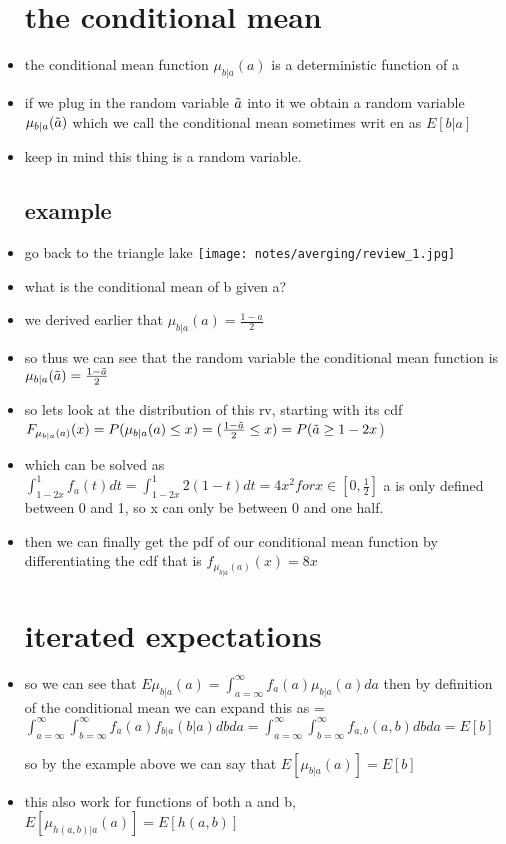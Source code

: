 \documentclass{article}
\begin{document}
\begin{itemize}
\section{the conditional mean}
\item the conditional mean function $\mu_{b|a}(a)$ is a deterministic function of a 
\item if we plug in the random variable $\Tilde{a}$ into it we obtain a random variable $\mu_{b|a}(\Tilde{a})$ which we call the conditional mean sometimes writ en as $E[b|a]$ 
\item keep in mind this thing is a random variable. 
\subsection{example}
\item go back to the triangle lake \texttt{[image: notes/averging/review\_1.jpg]}
\item what is the conditional mean of b given a?
\item we derived earlier that $\mu_{b|a}(a)=\frac{1-a}{2}$
\item so thus we can see that the random variable the conditional mean function is $\mu_{b|a}(\Tilde{a})=\frac{1-\Tilde{a}}{2}$ 
\item so lets look at the distribution of this rv, starting with its cdf $F_{\mu_{b|a}(a)}(x)=P(\mu_{b|a}(a)\leq x)=(\frac{1-\Tilde{a}}{2}\leq x)=P(\Tilde{a}\geq 1-2x$)
\item which can be solved as $\int_{1-2x}^{1}f_{a}(t)dt=\int_{1-2x}^{1}2(1-t)dt=4x^2 for x\in [0,\frac{1}{2}]$ a is only defined between 0 and 1, so x can only be between 0 and one half. 
\item then we can finally get the pdf of our conditional mean function by differentiating the cdf that is $f_{\mu_{b|a}(a)}(x)=8x$
\section{iterated expectations}
\item so we can see that $E{\mu_{b|a}(a)}=\int_{a=\infty}^{\infty}f_{a}(a)\mu_{b|a}(a)da$ then by definition of the conditional mean we can expand this as =$\int_{a=\infty}^{\infty}\int_{b=\infty}^{\infty}f_{a}(a)f_{b|a}(b|a)dbda=\int_{a=\infty}^{\infty}\int_{b=\infty}^{\infty}f_{a,b}(a,b)dbda=E[b]$

so by the example above we can say that $E[\mu_{b|a}(a)]=E[b]$
\item this also work for functions of both a and b, $E[\mu_{h(a,b)|a}(a)]=E[h(a,b)]$

\end{itemize}
\end{document}
